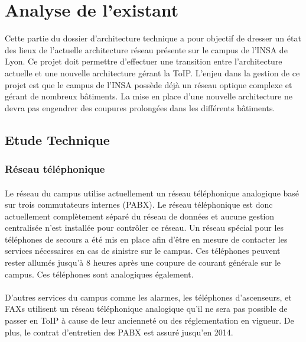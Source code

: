 \section{Analyse de l'existant}

Cette partie du dossier d'architecture technique a pour objectif de dresser un état des lieux de l'actuelle architecture réseau présente sur le campus de l'INSA de Lyon. Ce projet doit permettre d'effectuer une transition entre l'architecture actuelle et une nouvelle architecture gérant la ToIP. L'enjeu dans la gestion de ce projet est que le campus de l'INSA possède déjà un réseau optique complexe et gérant de nombreux bâtiments. La mise en place d'une nouvelle architecture ne devra pas engendrer des coupures prolongées dans les différents bâtiments.

\subsection{Etude Technique}

\subsubsection{Réseau téléphonique}

\paragraph{} Le réseau du campus utilise actuellement un réseau téléphonique analogique basé sur trois commutateurs internes (PABX). Le réseau téléphonique est donc actuellement complètement séparé du réseau de données et aucune gestion centralisée n'est installée pour contrôler ce réseau. Un réseau spécial pour les téléphones de secours a été mis en place afin d'être en mesure de contacter les services nécessaires en cas de sinistre sur le campus. Ces téléphones peuvent rester allumés jusqu'à 8 heures après une coupure de courant générale sur le campus. Ces téléphones sont analogiques également.

\paragraph{} D'autres services du campus comme les alarmes, les téléphones d'ascenseurs, et FAXs utilisent un réseau téléphonique analogique qu'il ne sera pas possible de passer en ToIP à cause de leur ancienneté ou des réglementation en vigueur. De plus, le contrat d'entretien des PABX est assuré jusqu'en 2014.


